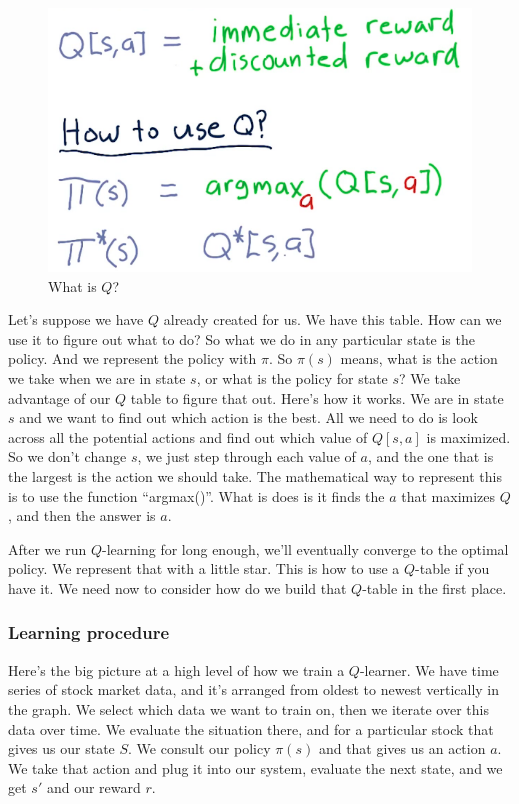 \documentclass[12pt]{article}
\newcommand{\q}[1]{``#1''}
\begin{document}
\begin{figure}[!ht]
\centering
\includegraphics[scale=0.4]{fig/fig104}
\caption{What is $Q$?}
\end{figure}

Let's suppose we have $Q$ already created for us. We have this table. How can we use it to figure out what to do? So what we do in any particular state is the policy. And we represent the policy with $\pi$. So $\pi(s)$ means, what is the action we take when we are in state $s$, or what is the policy for state $s$? We take advantage of our $Q$ table to figure that out. Here's how it works. We are in state $s$ and we want to find out which action is the best. All we need to do is look across all the potential actions and find out which value of $Q[s, a]$ is maximized. So we don't change $s$, we just step through each value of $a$, and the one that is the largest is the action we should take. The mathematical way to represent this is to use the function \q{argmax()}. What is does is it finds the $a$ that maximizes $Q$, and then the answer is $a$.

After we run $Q$-learning for long enough, we'll eventually converge to the optimal policy. We represent that with a little star. This is how to use a $Q$-table if you have it. We need now to consider how do we build that $Q$-table in the first place.  

\subsubsection{Learning procedure}

Here's the big picture at a high level of how we train a $Q$-learner. We have time series of stock market data, and it's arranged from oldest to newest vertically in the graph. We select which data we want to train on, then we iterate over this data over time. We evaluate the situation there, and for a particular stock that gives us our state $S$. We consult our policy $\pi(s)$ and that gives us an action $a$. We take that action and plug it into our system, evaluate the next state, and we get $s'$ and our reward $r$. 
\end{document}
